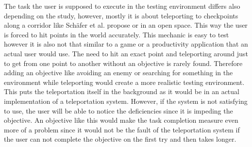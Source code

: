The task the user is supposed to execute in the testing environment differs also depending on the study, however, mostly it is about teleporting to checkpoints along a corridor like Schäfer et al. \cite{Schafer2021} propose or in an open space.
This way the user is forced to hit points in the world accurately. This mechanic is easy to test however it is also not that similar to a game or a productivity application that an actual user would use. The need to hit an exact point and teleporting around just to get from one point to another without an objective is rarely found. Therefore adding an objective like avoiding an enemy or searching for something in the environment while teleporting would create a more realistic testing environment. This puts the teleportation itself in the background as it would be in an actual implementation of a teleportation system. However, if the system is not satisfying to use, the user will be able to notice the deficiencies since it is impeding the objective. An objective like this would make the task completion measure even more of a problem since it would not be the fault of the teleportation system if the user can not complete the objective on the first try and then takes longer. 


